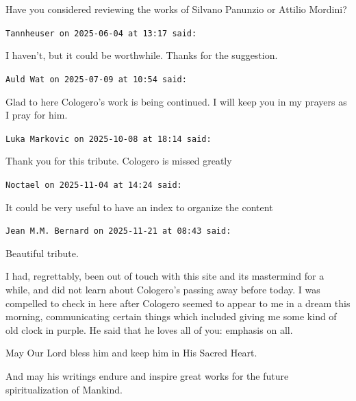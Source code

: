 \begin{footnotesize}
\begin{sffamily}
Have you considered reviewing the works of Silvano Panunzio or Attilio Mordini?

\hfill

\texttt{Tannheuser on 2025-06-04 at 13:17 said:}

I haven't, but it could be worthwhile. Thanks for the suggestion.

\hfill

\texttt{Auld Wat on 2025-07-09 at 10:54 said:}

Glad to here Cologero's work is being continued. I will keep you in my prayers as I pray for him.

\hfill

\texttt{Luka Markovic on 2025-10-08 at 18:14 said:}

Thank you for this tribute. Cologero is missed greatly

\hfill

\texttt{Noctael on 2025-11-04 at 14:24 said:}

It could be very useful to have an index to organize the content

\hfill

\texttt{Jean M.M. Bernard on 2025-11-21 at 08:43 said:}

Beautiful tribute.

I had, regrettably, been out of touch with this site and its mastermind for a while, and did not learn about Cologero's passing away before today. I was compelled to check in here after Cologero seemed to appear to me in a dream this morning, communicating certain things which included giving me some kind of old clock in purple. He said that he loves all of you: emphasis on all.

May Our Lord bless him and keep him in His Sacred Heart.

And may his writings endure and inspire great works for the future spiritualization of Mankind.

\end{sffamily}
\end{footnotesize}


